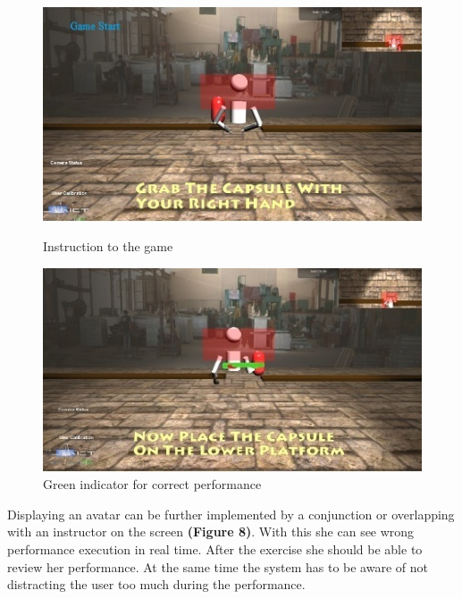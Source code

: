 \begin{figure}[htb]
	\centering
	\begin{minipage}[t]{0.49\linewidth}
		\centering
		\includegraphics[width=1\linewidth]{Pictures/gameInstruction}
		\caption{Instruction to the game \cite{Chang2012-hz}}
		\label{fig:gameInstruction}
	\end{minipage}
	\hfill
	\begin{minipage}[t]{0.49\linewidth}
		\centering
		\includegraphics[width=1\linewidth]{Pictures/gameHighlighting}
		\caption{Green indicator for correct performance \cite{Chang2012-hz}}
		\label{fig:gameHighlighting}
	\end{minipage}
\end{figure}

Displaying an avatar can be further implemented by a conjunction or overlapping with an instructor on the screen \textbf{(Figure 8)}. With this she can see wrong performance execution in real time. After the exercise she should be able to review her performance. At the same time the system has to be aware of not distracting the user too much during the performance. 